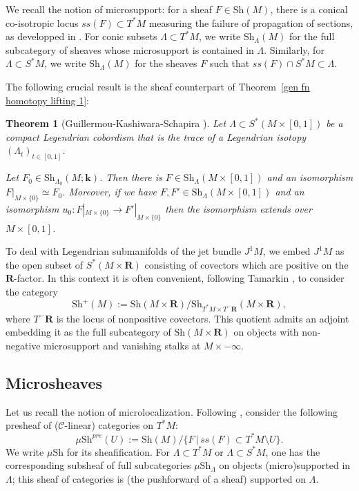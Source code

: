 \documentclass[12pt,a4paper]{article}
\numberwithin{equation}{section}
\newtheorem{thm}[equation]{Theorem}
\theoremstyle{definition}
\theoremstyle{remark}
\newcommand{\R}{\mathbf{R}}
\newcommand{\Sh}{\mathrm{Sh}}
\renewcommand{\k}{\mathbf{k}}
\begin{document}
We recall the notion of microsupport:  for a sheaf $F \in \Sh(M)$, there is a conical co-isotropic locus $ss(F) \subset T^*M$ measuring the failure of propagation of sections, as developped in \cite{Kashiwara-Schapira}.  For conic subsets $\Lambda \subset T^*M$, we write $\Sh_\Lambda(M)$ for the full subcategory of sheaves whose microsupport is contained in $\Lambda$.  Similarly, for $\Lambda \subset S^*M$, we write $\Sh_\Lambda(M)$ for the sheaves $F$ such that $ss(F) \cap S^*M \subset \Lambda$.


The following crucial result is the sheaf counterpart of Theorem~\ref{gen fn homotopy lifting 1}:

\begin{thm}[Guillermou-Kashiwara-Schapira \cite{GKS}] \label{sheaf homotopy lifting}
Let $\Lambda\subset S^*(M\times [0,1])$ be a compact Legendrian cobordism that is the trace of
a Legendrian isotopy $(\Lambda_t)_{t\in [0,1]}$.

Let $F_0\in \Sh_{\Lambda_0}(M;\k)$. Then there is $F\in \Sh_\Lambda(M\times [0,1])$ and an isomorphism $F|_{M\times \{0\}} \simeq F_0$.
Moreover, if we have $F,F'\in \Sh_\Lambda(M\times [0,1])$ and an isomorphism $u_0 : F|_{M\times \{0\}} \to F'|_{M\times \{0\}}$
then the isomorphism extends over $M\times [0,1]$.
\end{thm}


To deal with Legendrian submanifolds of the jet bundle $J^1 M$, we embed $J^1 M$ as the open subset of $S^*(M\times \R)$
consisting of covectors which are positive on the $\R$-factor.
In this context it is often convenient, following Tamarkin \cite{Tamarkin, Guillermou-Schapira-about-Tamarkin}, to consider the category
$$\Sh^+(M):=\Sh(M\times \R)/ \Sh_{T^*M \times T^-\R}(M \times \R),$$ where $T^- \R$ is the locus of nonpositive covectors.  This quotient admits an adjoint embedding it as the full subcategory  of $\Sh(M\times \R)$ on objects with non-negative microsupport and vanishing stalks at $M \times -\infty$.


\subsection{Microsheaves}

Let us recall the notion of microlocalization.  Following \cite[Chap. 6]{Kashiwara-Schapira}, consider the following
presheaf of ($\mathcal{C}$-linear) categories on $T^*M$:
$$\mu \Sh^{pre}(U) := \Sh(M) / \{F\, | \, ss(F) \subset T^*M \setminus U\}.$$
We write $\mu \Sh$ for its sheafification.  For $\Lambda \subset T^*M$ or $\Lambda \subset S^*M$, one has the corresponding  subsheaf of full subcategories
$\mu \Sh_\Lambda$ on objects (micro)supported in $\Lambda$; this sheaf of categories is (the pushforward of a sheaf) supported on $\Lambda$.
\end{document}
